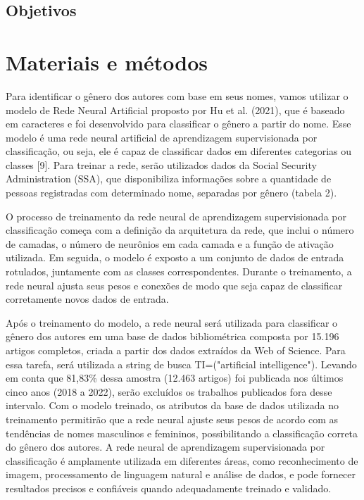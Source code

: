 \documentclass[conference,compsoc]{IEEEtran}
\begin{document}
\subsection{Objetivos}


\section{Materiais e métodos}

Para identificar o gênero dos autores com base em seus nomes, vamos utilizar o modelo de Rede Neural Artificial proposto por Hu et al. (2021), que é baseado em caracteres e foi desenvolvido para classificar o gênero a partir do nome. Esse modelo é uma rede neural artificial de aprendizagem supervisionada por classificação, ou seja, ele é capaz de classificar dados em diferentes categorias ou classes [9]. Para treinar a rede, serão utilizados dados da Social Security Administration (SSA), que disponibiliza informações sobre a quantidade de pessoas registradas com determinado nome, separadas por gênero (tabela 2).

O processo de treinamento da rede neural de aprendizagem supervisionada por classificação começa com a definição da arquitetura da rede, que inclui o número de camadas, o número de neurônios em cada camada e a função de ativação utilizada. Em seguida, o modelo é exposto a um conjunto de dados de entrada rotulados, juntamente com as classes correspondentes. Durante o treinamento, a rede neural ajusta seus pesos e conexões de modo que seja capaz de classificar corretamente novos dados de entrada.

Após o treinamento do modelo, a rede neural será utilizada para classificar o gênero dos autores em uma base de dados bibliométrica composta por 15.196 artigos completos, criada a partir dos dados extraídos da Web of Science. Para essa tarefa, será utilizada a string de busca TI=("artificial intelligence"). Levando em conta que 81,83\% dessa amostra (12.463 artigos) foi publicada nos últimos cinco anos (2018 a 2022), serão excluídos os trabalhos publicados fora desse intervalo. Com o modelo treinado, os atributos da base de dados utilizada no treinamento permitirão que a rede neural ajuste seus pesos de acordo com as tendências de nomes masculinos e femininos, possibilitando a classificação correta do gênero dos autores. A rede neural de aprendizagem supervisionada por classificação é amplamente utilizada em diferentes áreas, como reconhecimento de imagem, processamento de linguagem natural e análise de dados, e pode fornecer resultados precisos e confiáveis quando adequadamente treinado e validado.
\end{document}
